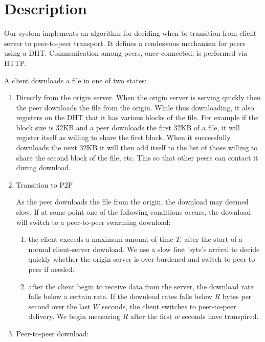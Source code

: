 \section{Description}
Our system implements an algorithm for deciding when to transition from client-server to peer-to-peer transport.  It defines a rendezvous mechanism for peers using a DHT.  Communication among peers, once connected, is performed via HTTP.

A client downloads a file in one of two states:
\begin{enumerate}
\item Directly from the origin server. When the origin server is serving quickly then the peer downloads the file from the origin.  While thus downloading, it also registers on the DHT that it has various blocks of the file.  For example if the block size is 32KB and a peer downloads the first 32KB of a file, it will register itself as willing to share the first block.  When it successfully downloads the next 32KB it will then add itself to the list of those willing to share the second block of the file, etc.  This so that other peers can contact it during download.

\item Transition to P2P

As the peer downloads the file from the origin, the download may deemed slow.  If at some point one of the following conditions occurs, the download will switch to a peer-to-peer swarming download:
\begin{enumerate}
\item the client exceeds a maximum amount of time $T$, after the start of a normal client-server download.  We use a slow first byte's arrival to decide quickly whether the origin server is over-burdened and switch to peer-to-peer if needed.
\item after the client begin to receive data from the server, the download rate falls below a certain rate.  If the download rates falls below $R$ bytes per second over the last $W$ seconds, the client switches to peer-to-peer delivery.  We begin measuring $R$ after the first $w$ seconds have transpired.
\end{enumerate}

\item Peer-to-peer download:


\end{enumerate}
